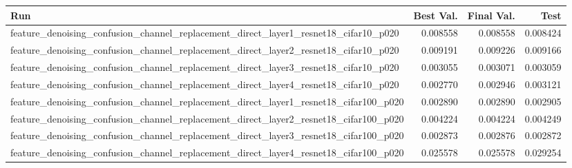 \begin{tabular}{lrrr}
\toprule
Run & Best Val. & Final Val. & Test \\
\midrule
feature\_denoising\_confusion\_channel\_replacement\_direct\_layer1\_resnet18\_cifar10\_p020 & 0.008558 & 0.008558 & 0.008424 \\
feature\_denoising\_confusion\_channel\_replacement\_direct\_layer2\_resnet18\_cifar10\_p020 & 0.009191 & 0.009226 & 0.009166 \\
feature\_denoising\_confusion\_channel\_replacement\_direct\_layer3\_resnet18\_cifar10\_p020 & 0.003055 & 0.003071 & 0.003059 \\
feature\_denoising\_confusion\_channel\_replacement\_direct\_layer4\_resnet18\_cifar10\_p020 & 0.002770 & 0.002946 & 0.003121 \\
feature\_denoising\_confusion\_channel\_replacement\_direct\_layer1\_resnet18\_cifar100\_p020 & 0.002890 & 0.002890 & 0.002905 \\
feature\_denoising\_confusion\_channel\_replacement\_direct\_layer2\_resnet18\_cifar100\_p020 & 0.004224 & 0.004224 & 0.004249 \\
feature\_denoising\_confusion\_channel\_replacement\_direct\_layer3\_resnet18\_cifar100\_p020 & 0.002873 & 0.002876 & 0.002872 \\
feature\_denoising\_confusion\_channel\_replacement\_direct\_layer4\_resnet18\_cifar100\_p020 & 0.025578 & 0.025578 & 0.029254 \\
\bottomrule
\end{tabular}
